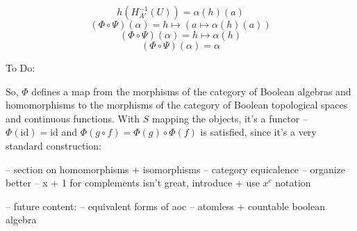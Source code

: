 \documentclass{article}
\begin{document}
      \[ h ( H_{A'}^{-1} (U)) = \alpha(h)(a)\]
      \[(\Phi \circ \Psi)(\alpha) = h \mapsto (a \mapsto \alpha(h)(a))\]
      \[(\Phi \circ \Psi)(\alpha) =  h \mapsto \alpha(h)\]
      \[(\Phi \circ \Psi)(\alpha) = \alpha\]

    To Do:

      So, $\Phi$ defines a map from the morphisms of the category of Boolean
      algebras and homomorphisms to the morphisms of the category of Boolean
      topological spaces and continuous functions. With $S$ mapping the objects,
      it's a functor -- $\Phi(\text{id}) = \text{id}$ and $\Phi(g \circ f) =
      \Phi(g) \circ \Phi(f)$ is satisfied, since it's a very standard
      construction:




      -- section on homomorphisms + isomorphisms
      -- category equicalence
      -- organize better
      -- x + 1 for complements isn't great, introduce + use $x^c$ notation

      -- future content:
      -- equivalent forms of aoc
      -- atomless + countable boolean algebra
\end{document}
